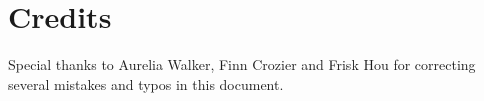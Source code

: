 \section{Credits}

Special thanks to Aurelia Walker, Finn Crozier and Frisk Hou for correcting several mistakes and typos in this document.